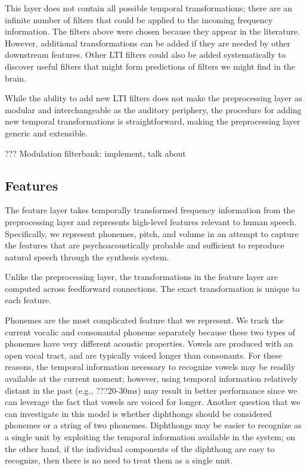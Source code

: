 This layer does not contain all possible
temporal transformations;
there are an infinite number of filters
that could be applied to the incoming
frequency information.
The filters above were chosen
because they appear in the literature.
However, additional transformations
can be added if they are needed
by other downstream features.
Other LTI filters could also be added
systematically to discover useful filters
that might form predictions of
filters we might find in the brain.

While the ability to add new LTI filters
does not make the preprocessing layer
as modular and interchangeable
as the auditory periphery,
the procedure for adding
new temporal transformations
is straightforward,
making the preprocessing layer
generic and extensible.


??? Modulation filterbank: implement, talk about

\subsection{Features}

The feature layer takes temporally transformed
frequency information from the preprocessing layer
and represents high-level features relevant
to human speech.
Specifically, we represent phonemes,
pitch, and volume in an attempt
to capture the features that are
psychoacoustically probable
and sufficient to reproduce
natural speech through the synthesis system.

Unlike the preprocessing layer,
the transformations in the feature layer
are computed across feedforward connections.
The exact transformation is unique to each feature.

Phonemes are the most complicated feature
that we represent.
We track
the current vocalic and consonantal phoneme separately
because these two types of phonemes
have very different acoustic properties.
Vowels are produced with an open vocal tract,
and are typically voiced longer than consonants.
For these reasons, the temporal information
necessary to recognize vowels
may be readily available at
the current moment;
however, using temporal information relatively
distant in the past (e.g., ???20-30ms)
may result in better performance since we can
leverage the fact that vowels are voiced for longer.
Another question that we can investigate in this model
is whether diphthongs should be considered phonemes
or a string of two phonemes.
Diphthongs may be easier to recognize as a single unit
by exploiting the temporal information available
in the system;
on the other hand, if the individual components
of the diphthong are easy to recognize,
then there is no need to treat them as a single unit.

